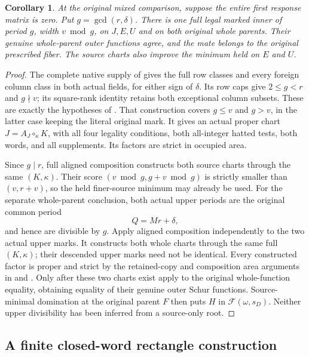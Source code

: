 \documentclass[11pt,a4paper]{amsart}
\numberwithin{equation}{section}
\theoremstyle{plain}
\newtheorem{corollary}[theorem]{Corollary}
\theoremstyle{definition}
\begin{document}
\begin{corollary}\label{ge:zero-matrix-finish}
At the original mixed comparison, suppose the entire first response
matrix is zero.  Put \(g=\gcd(r,\delta)\).  There is one full legal
marked inner of period \(g\), width \(v\bmod g\), on \(J,E,U\)
and on both original whole parents.  Their genuine whole-parent outer
functions agree, and the mate belongs to the original prescribed fiber.
The source charts also improve the minimum held on \(E\) and \(U\).
\end{corollary}
\begin{proof}
The complete native supply of  gives the full
row classes and every foreign column class in both actual fields, for
either sign of \(\delta\).  Its row caps give
\(2\le g<r\) and \(g\nmid v\); its square-rank identity retains
both exceptional column subsets.  These are exactly the hypotheses of
\cite[Mixed residue fold]{Shields2026Gluing}.  That construction covers \(g\le v\) and
\(g>v\), in the latter case keeping the literal original mark.
It gives an actual proper chart \(J=A_J\circ_\kappa K\), with
all four legality conditions, both all-integer hatted tests, both words,
and all supplements.  Its factors are strict in occupied area.

Since \(g\mid r\), full aligned composition constructs both source
charts through the same \((K,\kappa)\).  Their score
\((v\bmod g,g+v\bmod g)\) is strictly smaller than \((v,r+v)\),
so the held finer-source minimum may already be used.
For the separate whole-parent conclusion, both actual upper periods
are the original common period
\[
 Q=Mr+\delta,
\]
and hence are divisible by \(g\).  Apply aligned composition
independently to the two actual upper marks.  It constructs both whole
charts through the same full \((K,\kappa)\); their descended upper
marks need not be identical.  Every constructed factor is proper and
strict by the retained-copy and composition area arguments in
 and \cite[Recovery from the generic words]{Shields2026Gluing}.  Only after these two charts exist
apply  to the original whole-function
equality, obtaining equality of their genuine outer Schur functions.
Source-minimal domination at the original parent \(F\) then puts
\(H\) in \(\mathcal F(\omega,s_D)\).
Neither upper divisibility has been inferred from a source-only root.
\end{proof}

\subsection{A finite closed-word rectangle construction}
\end{document}
